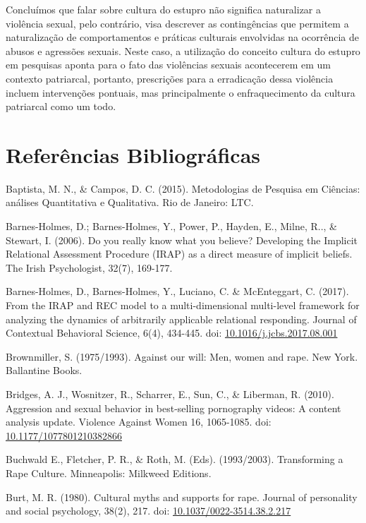 Concluímos que falar sobre cultura do estupro não significa naturalizar a violência sexual, pelo contrário, visa descrever as contingências que permitem a naturalização de comportamentos e práticas culturais envolvidas na ocorrência de abusos e agressões sexuais. Neste caso, a utilização do conceito cultura do estupro em pesquisas aponta para o fato das violências sexuais acontecerem em um contexto patriarcal, portanto, prescrições para a erradicação dessa violência incluem intervenções pontuais, mas principalmente o enfraquecimento da cultura patriarcal como um todo.
\vfill
\pagebreak
\section*{Referências Bibliográficas}

\hangindent=25pt
\noindent Baptista, M. N., \& Campos, D. C. (2015). Metodologias de Pesquisa em Ciências: análises Quantitativa e Qualitativa. Rio de Janeiro: LTC.

\hangindent=25pt
\noindent Barnes-Holmes, D.; Barnes-Holmes, Y., Power, P., Hayden, E., Milne, R.., \& Stewart, I. (2006). Do you really know what you believe? Developing the Implicit Relational Assessment Procedure (IRAP) as a direct measure of implicit beliefs. The Irish Psychologist, 32(7), 169-177. 

\hangindent=25pt
\noindent Barnes-Holmes, D., Barnes-Holmes, Y., Luciano, C. \& McEnteggart, C. (2017). From the IRAP and REC model to a multi-dimensional multi-level framework for analyzing the dynamics of arbitrarily applicable relational responding. Journal of Contextual Behavioral Science, 6(4), 434-445. doi: \url{10.1016/j.jcbs.2017.08.001}

\hangindent=25pt
\noindent Brownmiller, S. (1975/1993). Against our will: Men, women and rape. New York. Ballantine Books.

\hangindent=25pt
\noindent Bridges, A. J., Wosnitzer, R., Scharrer, E., Sun, C., \& Liberman, R. (2010). Aggression and sexual behavior in best-selling pornography videos: A content analysis update. Violence Against Women 16, 1065-1085. doi: \url{10.1177/1077801210382866}

\hangindent=25pt
\noindent Buchwald E., Fletcher, P. R., \& Roth, M. (Eds). (1993/2003). Transforming a Rape Culture. Minneapolis: Milkweed Editions.

\hangindent=25pt
\noindent Burt, M. R. (1980). Cultural myths and supports for rape. Journal of personality and social psychology, 38(2), 217. doi: \url{10.1037/0022-3514.38.2.217}

